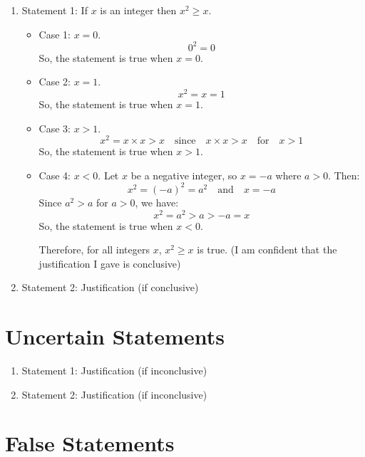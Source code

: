 \documentclass{article}
\begin{document}
\begin{enumerate}
    \item Statement 1: If $x$ is an integer then $x^2 \geq x$.
          \begin{itemize}
              \item Case 1: $x = 0$.
                    \[
                        0^2 = 0
                    \]
                    So, the statement is true when $x = 0$.
              \item Case 2: $x = 1$.
                    \[
                        x^2 = x = 1
                    \]
                    So, the statement is true when $x = 1$.
              \item Case 3: $x > 1$.
                    \[
                        x^2 = x \times x > x \quad \text{since} \quad x \times x > x \quad \text{for} \quad x > 1
                    \]
                    So, the statement is true when $x > 1$.
              \item Case 4: $x < 0$.\newline
                    Let \(x\) be a negative integer, so \(x = -a\) where \(a > 0\). Then:
                    \[
                        x^2 = {(-a)}^2 = a^2 \quad \text{and} \quad x = -a
                    \]
                    Since \(a^2 > a\) for \(a > 0\), we have:
                    \[
                        x^2 = a^2 > a > -a = x
                    \]
                    So, the statement is true when $x < 0$.

                    Therefore, for all integers \(x\), \(x^2 \geq x\) is true.\newline
                    (I am confident that the justification I gave is conclusive)
          \end{itemize}
    \item Statement 2: Justification (if conclusive)
\end{enumerate}

\section{Uncertain Statements}

\begin{enumerate}
    \item Statement 1: Justification (if inconclusive)
    \item Statement 2: Justification (if inconclusive)
\end{enumerate}

\section{False Statements}
\end{document}
